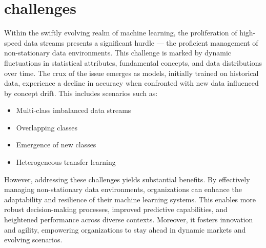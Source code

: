 \section{challenges}
\label{sec:1_introduction_challange}
Within the swiftly evolving realm of machine learning, the proliferation of high-speed data streams presents a significant hurdle — the proficient management of non-stationary data environments. This challenge is marked by dynamic fluctuations in statistical attributes, fundamental concepts, and data distributions over time. The crux of the issue emerges as models, initially trained on historical data, experience a decline in accuracy when confronted with new data influenced by concept drift. This includes scenarios such as:
\begin{itemize}
    \item Multi-class imbalanced data streams
    \item Overlapping classes
    \item Emergence of new classes
    \item Heterogeneous transfer learning
\end{itemize}
However, addressing these challenges yields substantial benefits. By effectively managing non-stationary data environments, organizations can enhance the adaptability and resilience of their machine learning systems. This enables more robust decision-making processes, improved predictive capabilities, and heightened performance across diverse contexts. Moreover, it fosters innovation and agility, empowering organizations to stay ahead in dynamic markets and evolving scenarios.